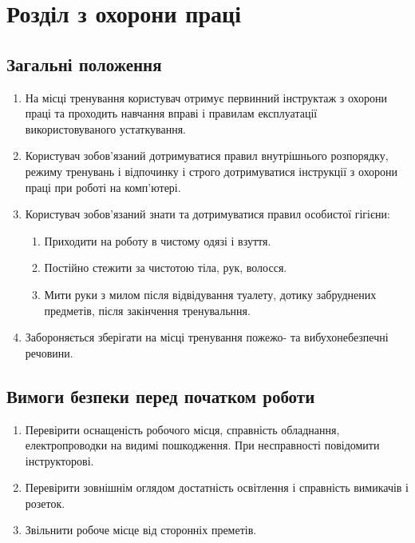 \section{Розділ з охорони праці}
\subsection{Загальні положення}
\begin{enumerate}
  \item На місці тренування користувач отримує первинний інструктаж з охорони праці
    та проходить навчання вправі і правилам експлуатації використовуваного устаткування.
  \item Користувач зобов'язаний дотримуватися правил внутрішнього розпорядку,
    режиму тренувань і відпочинку і строго дотримуватися інструкції з охорони праці
    при роботі на комп’ютері.
  \item Користувач зобов'язаний знати та дотримуватися правил особистої гігієни:
    \begin{enumerate}
      \item Приходити на роботу в чистому одязі і взуття.
      \item Постійно стежити за чистотою тіла, рук, волосся.
      \item Мити руки з милом після відвідування туалету,
        дотику забруднених предметів, після закінчення тренувальння.
    \end{enumerate}
  \item Забороняється зберігати на місці тренування
    пожежо- та вибухонебезпечні речовини.
\end{enumerate}
\newpage
\subsection{Вимоги безпеки перед початком роботи}
\begin{enumerate}
  \item Перевірити оснащеність робочого місця, справність обладнання,
    електропроводки на видимі пошкодження. При несправності
    повідомити інструкторові.
  \item Перевірити зовнішнім оглядом достатність освітлення
    і справність вимикачів і розеток.
  \item Звільнити робоче місце від сторонніх преметів.
\end{enumerate}
\newpage
